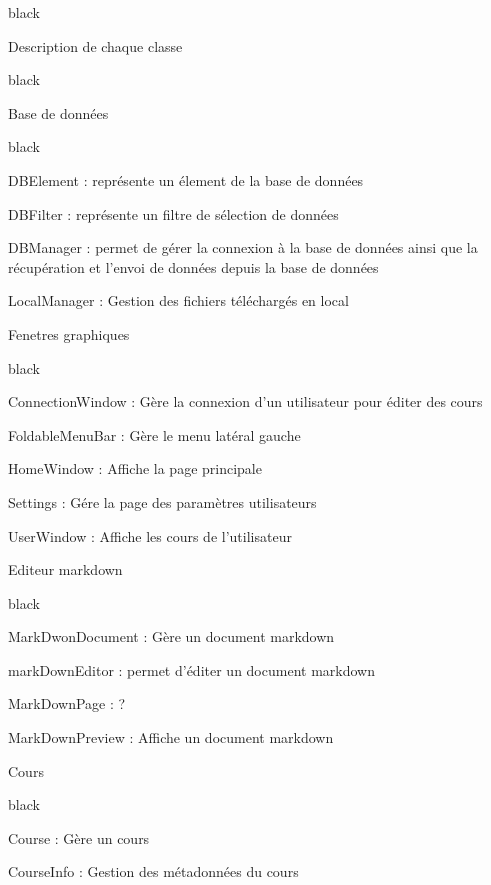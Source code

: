 \begin{items}{black}{\Bullet}
\item Description de chaque classe

\begin{items}{black}{\Triangle}

\item Base de données

\begin{items}{black}{\Bullet}

\item DBElement : représente un élement de la base de données
\item DBFilter : représente un filtre de sélection de données
\item DBManager : permet de gérer la connexion à la base de données ainsi que la récupération et l'envoi de données depuis la base de données 
\item LocalManager : Gestion des fichiers téléchargés en local
\end{items}

\item Fenetres graphiques

\begin{items}{black}{\Bullet}

\item ConnectionWindow : Gère la connexion d'un utilisateur pour éditer des cours
\item FoldableMenuBar : Gère le menu latéral gauche
\item HomeWindow : Affiche la page principale
\item Settings : Gére la page des paramètres utilisateurs
\item UserWindow : Affiche les cours de l'utilisateur
\end{items}


\item Editeur markdown

\begin{items}{black}{\Bullet}
\item MarkDwonDocument : Gère un document markdown
\item markDownEditor : permet d'éditer un document markdown
\item MarkDownPage : ?
\item MarkDownPreview : Affiche un document markdown
\end{items}

\item Cours

\begin{items}{black}{\Bullet}
\item Course : Gère un cours
\item CourseInfo : Gestion des métadonnées du cours
\end{items}


\end{items}
\end{items}
